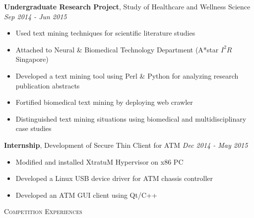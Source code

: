 \documentclass[a4paper, 12pt]{article}
\newenvironment{changemargin}[2]{%
  \begin{list}{}{%
      \setlength{\topsep}{0pt}%
      \setlength{\leftmargin}{#1}%
      \setlength{\rightmargin}{#2}%
      \setlength{\listparindent}{\parindent}%
      \setlength{\itemindent}{\parindent}%
      \setlength{\parsep}{\parskip}%
    }%
  \item[]}{\end{list}
}
\newcommand{\lineover}{
  \begin{changemargin}{-0.05in}{-0.05in}
    \vspace*{-8pt}
    \hrulefill \\
    \vspace*{-2pt}
  \end{changemargin}
}
\newcommand{\header}[1]{
  \begin{changemargin}{-0.6in}{-0.6in}
    \fontsize{15}{15}\scshape{#1}\\
    \lineover
    \vspace*{-4pt}
  \end{changemargin}
}
\newenvironment{body}
{
\vspace*{-16pt}
\begin{changemargin}{-0.25in}{-0.5in}
}
{
\end{changemargin}
}
\begin{document}
\begin{body}
  \textbf{Undergraduate Research Project}, {Study of Healthcare and Wellness Science} \hfill \emph{Sep 2014 - Jun 2015}\\
  \vspace*{-6pt}
  \begin{itemize} \itemsep -0pt  \small
  \item Used text mining techniques for scientific literature studies
  \item Attached to Neural \& Biomedical Technology Department (A*star $I^{2}R$ Singapore)
  \item Developed a text mining tool using Perl \& Python for analyzing research publication abstracts
  \item Fortified biomedical text mining by deploying web crawler
  \item Distinguished text mining situations using biomedical and multidisciplinary case studies
  \end{itemize}

  \textbf{Internship}, {Development of Secure Thin Client for ATM} \hfill \emph{Dec 2014 - May 2015}\\
  \vspace*{-6pt}
  \begin{itemize} \itemsep -0pt  \small
  \item Modified and installed XtratuM Hypervisor on x86 PC
  \item Developed a Linux USB device driver for ATM chassis controller
  \item Developed an ATM GUI client using Qt/C++
  \end{itemize}
\end{body}

\header{Competition Experiences}
\end{document}
